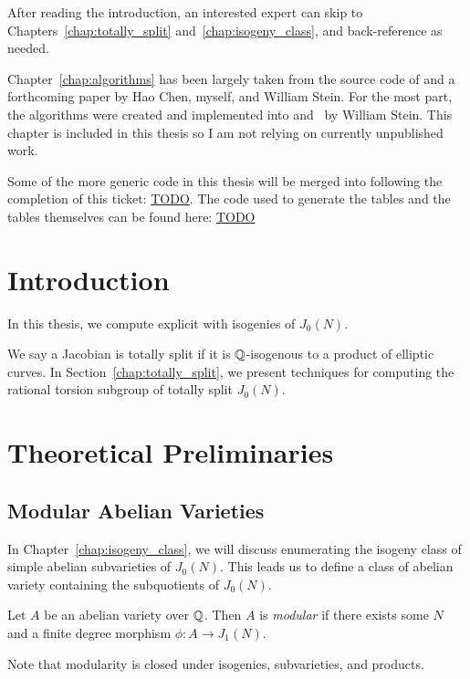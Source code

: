 \documentclass[11pt, proquest]{uwthesis}
\begin{document}
After reading the introduction, an interested expert can skip to
Chapters~\ref{chap:totally_split} and~\ref{chap:isogeny_class}, and
back-reference as needed.

Chapter~\ref{chap:algorithms} has been largely taken from the source code of
\sage and a forthcoming paper by Hao Chen, myself, and William Stein. For the
most part, the algorithms were created and implemented into \sage and \magma~by
William Stein. This chapter is included in this thesis so I am not relying on
currently unpublished work.

Some of the more generic code in this thesis will be merged into
\sage following the completion of this ticket: \url{TODO}. The code used to
generate the tables and the tables themselves can be found here: \url{TODO}

\chapter{Introduction}%
\label{chap:intro}

In this thesis, we compute explicit with isogenies of $J_0(N)$.

We say a Jacobian is totally split if it is $\mathbb{Q}$-isogenous to a product of
elliptic curves. In Section~\ref{chap:totally_split}, we present techniques for
computing the rational torsion subgroup of totally split $J_0(N)$.


\chapter{Theoretical Preliminaries}%
\label{chap:prelim}

\section{Modular Abelian Varieties}

In Chapter~\ref{chap:isogeny_class}, we will discuss enumerating the isogeny
class of simple abelian subvarieties of $J_0(N)$. This leads us to define a
class of abelian variety containing the subquotients of $J_0(N)$.

\begin{definition}
    \label{defn:modabvar}
    Let $A$ be an abelian variety over $\mathbb{Q}$. Then $A$ is \emph{modular} if
    there exists some $N$ and a finite degree morphism $\phi:A\to J_1(N)$.

    Note that modularity is closed under isogenies, subvarieties, and products.
\end{definition}
\end{document}
